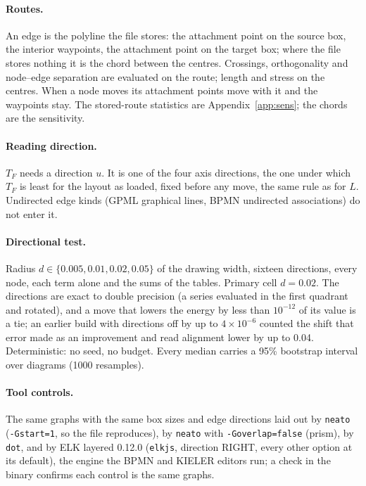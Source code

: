 \documentclass[a4paper,UKenglish]{gd-lipics-v3}
\begin{document}
\paragraph{Routes.} An edge is the polyline the file stores: the attachment point on the
source box, the interior waypoints, the attachment point on the target box; where the file
stores nothing it is the chord between the centres. Crossings, orthogonality and node--edge
separation are evaluated on the route; length and stress on the centres. When a node moves
its attachment points move with it and the waypoints stay. The stored-route statistics are Appendix~\ref{app:sens}; the chords are the sensitivity.

\paragraph{Reading direction.} $T_F$ needs a direction $u$. It is one of the four axis directions, the one under which $T_F$ is least for the layout as loaded, fixed before any move, the same rule as for $L$. Undirected edge kinds (GPML graphical lines, BPMN undirected associations) do not enter it.

\paragraph{Directional test.} Radius $d \in \{0.005, 0.01, 0.02, 0.05\}$ of the drawing
width, sixteen directions, every node, each term alone and the sums of the tables. Primary cell $d = 0.02$. The directions are exact to double precision (a series evaluated in the first quadrant and rotated), and a move that lowers the energy by less than $10^{-12}$ of its value is a tie; an earlier build with directions off by up to $4 \times 10^{-6}$ counted the shift that error made as an improvement and read alignment lower by up to 0.04. Deterministic: no seed, no budget. Every median carries a 95\% bootstrap interval over diagrams (1000 resamples). 

\paragraph{Tool controls.} The same graphs with the same box sizes and edge directions laid out by \texttt{neato} (\texttt{-Gstart=1}, so the file reproduces), by \texttt{neato} with \texttt{-Goverlap=false} (prism), by \texttt{dot}, and by ELK layered 0.12.0 (\texttt{elkjs}, direction RIGHT, every other option at its default), the engine the BPMN and KIELER editors run; a check in the binary confirms each control is the same graphs.
\end{document}
